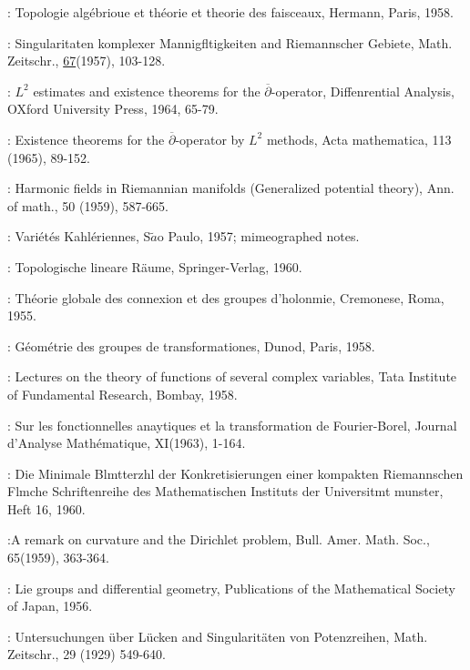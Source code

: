 \begin{thebibliography}{99}
: Topologie alg\'ebrioue et
  th\'eorie et theorie des faisceaux, Hermann, Paris, 1958.

: Singularitaten komplexer
  Mannigfltigkeiten and Riemannscher Gebiete, Math. Zeitschr.,
  \underline{67}(1957), 103-128.

: $L^2$ estimates and existence theorems
  for the $\overline{\partial}$-operator, Diffenrential Analysis,
  OXford University Press, 1964, 65-79.

: Existence theorems for the
  $\overline{\partial}$-operator by $L^2$ methods, Acta
  mathematica, 113 (1965), 89-152.

: Harmonic fields in Riemannian manifolds
  (Generalized potential theory), Ann. of math., 50 (1959), 587-665.

: Vari\'et\'es
  Kahl\'eriennes, S$\tilde{a}$o Paulo, 1957; mimeographed notes.  

: Topologische lineare R\"aume,
  Springer-Verlag, 1960.

: Th\'eorie globale
  des connexion et des groupes d'holonmie, Cremonese, Roma, 1955. 

:
  G\'eom\'etrie des groupes de transformationes, Dunod, Paris, 1958.     

: Lectures on the theory of functions of
  several complex variables, Tata Institute of Fundamental
  Research, Bombay, 1958. 

: Sur les fonctionnelles anaytiques et la
  transformation de Fourier-Borel, Journal d'Analyse
  Math\'ematique, XI(1963), 1-164. 

: Die Minimale Blmtterzhl der
  Konkretisierungen einer kompakten Riemannschen Flmche Schriftenreihe
  des Mathematischen Instituts der Universitmt munster, Heft 16, 1960.

:\pageoriginale A remark on curvature
  and the Dirichlet problem, Bull. Amer. Math. Soc., 65(1959),
  363-364.  

:  Lie groups and differential geometry,
  Publications of the Mathematical Society of Japan, 1956.

: Untersuchungen \"uber L\"ucken
  and Singularit\"aten von Potenzreihen, Math. Zeitschr.,
  29 (1929) 549-640. 


\end{thebibliography}
